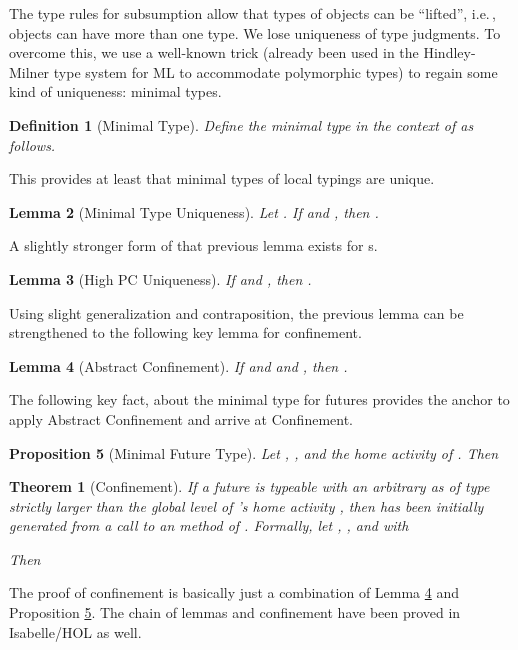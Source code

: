 \documentclass[10pt, conference, compsocconf]{IEEEtran}
\newcommand\ie{i.e.\!\,, }
\newtheorem{theorem}{Theorem}
\newtheorem{definition}{Definition}[section]
\newtheorem{proposition}[definition]{Proposition}
\newtheorem{lemma}[definition]{Lemma}
\begin{document}
{The type rules for subsumption allow that 
types of objects can be ``lifted'', \ie
objects can have more than one type. We lose uniqueness of type judgments. To overcome this, we use a well-known trick (already
been used in the Hindley-Milner type system for ML to accommodate polymorphic types) 
to regain some kind of uniqueness: minimal types. 
\begin{definition}[Minimal Type]
Define the minimal type in the  context of  as follows.

\end{definition}
This provides at least that minimal types of local typings are unique.
\begin{lemma}[Minimal Type Uniqueness]
Let .
If  and , 
then .
\end{lemma}

A slightly stronger form of that previous lemma exists for  s.
\begin{lemma}[High PC Uniqueness]
If  and , then .
\end{lemma}

Using slight generalization and contraposition, the previous lemma can be strengthened to the following key
lemma for confinement.
\begin{lemma}[Abstract Confinement]
\label{lem:absconf}
If  and  and , 
then .
\end{lemma}
The following key fact, about the minimal type for futures provides the anchor to apply 
Abstract Confinement and arrive at Confinement.
\begin{proposition}[Minimal Future Type]
\label{prop:minfut}
Let ,
, and  the home activity of . Then 

\end{proposition}


\begin{theorem}[Confinement]
\label{thm:conf}
If a future  is typeable with an arbitrary   as of type  strictly larger than
the global level of 's home activity , then  has been initially generated from a call
to an  method of .
Formally, 
let , , 
and  with
 
Then 

\end{theorem}

The proof of confinement is basically just a combination of Lemma \ref{lem:absconf}
and Proposition \ref{prop:minfut}. The chain of lemmas and confinement have been proved in Isabelle/HOL
as well.

}
\end{document}
